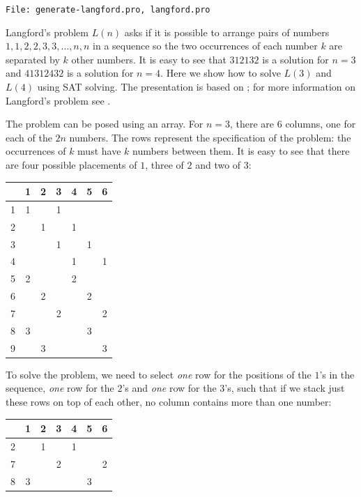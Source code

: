 \documentclass[11pt]{report}
\newcommand*{\p}[1]{\textup{\texttt{#1}}}
\newcommand*{\fl}[1]{\parbox{\textwidth}{\raggedleft \p{File: #1}}}
\begin{document}
\fl{generate-langford.pro, langford.pro}

Langford's problem $L(n)$ asks if it is possible to arrange pairs of numbers $1,1,2,2,3,3,\ldots,n,n$ in a sequence so the two occurrences of each number $k$ are separated by $k$ other numbers. It is easy to see that $312132$ is a solution for $n=3$ and $41312432$ is a solution for $n=4$. Here we show how to solve $L(3)$ and $L(4)$ using SAT solving. The presentation is based on \cite{knuth-sat}; for more information on Langford's problem see \cite{miller-lang}.

The problem can be posed using an array. For $n=3$, there are $6$ columns, one for each of the $2n$ numbers. The rows represent the specification of the problem: the occurrences of $k$ must have $k$ numbers between them. It is easy to see that there are four possible placements of $1$, three of $2$ and two of $3$:

\begin{center}
\begin{tabular}{|c||c|c|c|c|c|c|}
\hline
&1&2&3&4&5&6\\\hline\hline
1&1&&1&&&\\\hline
2&&1&&1&&\\\hline
3&&&1&&1&\\\hline
4&&&&1&&1\\\hline
5&2&&&2&&\\\hline
6&&2&&&2&\\\hline
7&&&2&&&2\\\hline
8&3&&&&3&\\\hline
9&&3&&&&3\\\hline
\end{tabular}
\end{center}

To solve the problem, we need to select \emph{one} row for the positions of the $1$'s in the sequence, \emph{one} row for the $2$'s and \emph{one} row for the $3$'s, such that if we stack just these rows on top of each other, no column contains more than one number:

\begin{center}
\begin{tabular}{|c||c|c|c|c|c|c|}
\hline
&1&2&3&4&5&6\\\hline\hline
2&&1&&1&&\\\hline
7&&&2&&&2\\\hline
8&3&&&&3&\\\hline
\end{tabular}
\end{center}
\end{document}
